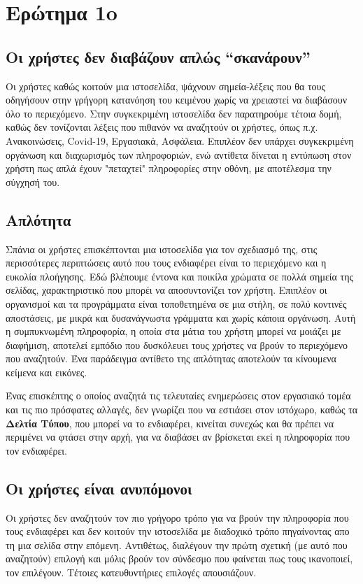 \documentclass[12pt]{article}
\begin{document}
\section{Ερώτημα 1o}

\subsection{Οι χρήστες δεν διαβάζουν απλώς “σκανάρουν”}
Οι χρήστες καθώς κοιτούν μια ιστοσελίδα, ψάχνουν σημεία-λέξεις που θα τους οδηγήσουν στην γρήγορη κατανόηση του κειμένου χωρίς να χρειαστεί να διαβάσουν όλο το περιεχόμενο. Στην συγκεκριμένη ιστοσελίδα δεν παρατηρούμε τέτοια δομή, καθώς δεν τονίζονται λέξεις που πιθανόν να αναζητούν οι χρήστες, όπως π.χ. Ανακοινώσεις, \textlatin{Covid-19}, Εργασιακά, Ασφάλεια. Επιπλέον δεν υπάρχει συγκεκριμένη οργάνωση και διαχωρισμός των πληροφοριών, ενώ αντίθετα δίνεται η εντύπωση στον χρήστη πως απλά έχουν "πεταχτεί" πληροφορίες στην οθόνη, με αποτέλεσμα την σύγχησή του.

\subsection{Απλότητα}
Σπάνια οι χρήστες επισκέπτονται μια ιστοσελίδα για τον σχεδιασμό της, στις περισσότερες περιπτώσεις αυτό που τους ενδιαφέρει είναι το περιεχόμενο και η ευκολία πλοήγησης. Εδώ βλέπουμε έντονα και ποικίλα χρώματα σε πολλά σημεία της σελίδας, χαρακτηριστικό που μπορέι να αποσυντονίζει τον χρήστη. Επιπλέον οι οργανισμοί και τα προγράμματα είναι τοποθετημένα σε μια στήλη, σε πολύ κοντινές αποστάσεις, με μικρά και δυσανάγνωστα γράμματα και χωρίς κάποια οργάνωση.
Αυτή η συμπυκνωμένη πληροφορία, η οποία στα μάτια του χρήστη μπορεί να μοιάζει με διαφήμιση, αποτελεί εμπόδιο που δυσκόλευει τους χρήστες να βρούν το περιεχόμενο που αναζητούν. Ένα παράδειγμα αντίθετο της απλότητας αποτελούν τα κίνουμενα κείμενα και εικόνες.

Ένας επισκέπτης ο οποίος αναζητά τις τελευταίες ενημερώσεις στον εργασιακό τομέα και τις πιο πρόσφατες αλλαγές, δεν γνωρίζει που να εστιάσει στον ιστόχωρο, καθώς τα \textbf{Δελτία Τύπου}, που μπορεί να το ενδιαφέρει, κινείται συνεχώς και θα πρέπει να περιμένει να φτάσει στην αρχή, για να διαβάσει αν βρίσκεται εκεί η πληροφορία που τον ενδιαφέρει. 

\subsection{Οι χρήστες είναι ανυπόμονοι}
Οι χρήστες δεν αναζητούν τον πιο γρήγορο τρόπο για να βρούν την πληροφορία που τους ενδιαφέρει και δεν κοιτούν την ιστοσελίδα με διαδοχικό τρόπο πηγαίνοντας απο τη μια σελίδα στην επόμενη. Αντιθέτως, διαλέγουν την πρώτη σχετική (με αυτό που αναζητούν) επιλογή και μόλις βρούν τον σύνδεσμο που φαίνεται πως τους ικανοποιεί, τον επιλέγουν. Τέτοιες κατευθυντήριες επιλογές απουσιάζουν. 
\end{document}
